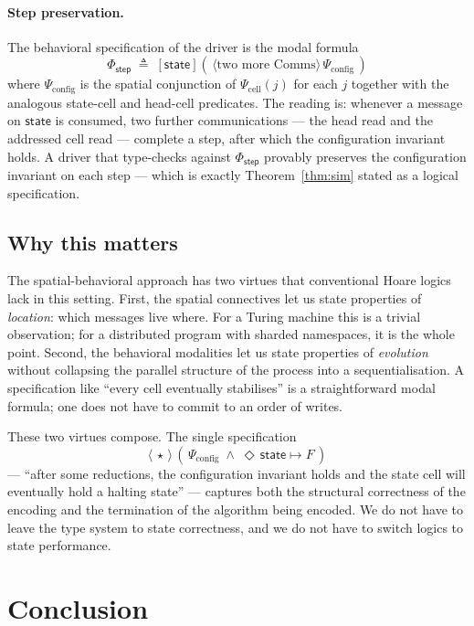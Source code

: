 \documentclass[11pt]{article}
\theoremstyle{plain}
\theoremstyle{definition}
\theoremstyle{remark}
\newcommand{\Step}{\mathsf{step}}
\newcommand{\St}{\mathsf{state}}
\begin{document}
\paragraph{Step preservation.}
The behavioral specification of the driver is the modal formula
$$
\Phi_{\Step}
\;\triangleq\;
[\St](\,\langle \text{two more Comms}\rangle\,\Psi_{\text{config}}\,)
$$
\noindent where $\Psi_{\text{config}}$ is the spatial conjunction of
$\Psi_{\text{cell}}(j)$ for each $j$ together with the analogous
state-cell and head-cell predicates. The reading is: whenever a message
on $\St$ is consumed, two further communications --- the head read and
the addressed cell read --- complete a step, after which the
configuration invariant holds. A driver that type-checks against
$\Phi_{\Step}$ provably preserves the configuration invariant on each
step --- which is exactly Theorem~\ref{thm:sim} stated as a logical
specification.

\subsection{Why this matters}

The spatial-behavioral approach has two virtues that conventional Hoare
logics lack in this setting. First, the spatial connectives let us state
properties of \emph{location}: which messages live where. For a Turing
machine this is a trivial observation; for a distributed program with
sharded namespaces, it is the whole point. Second, the behavioral
modalities let us state properties of \emph{evolution} without
collapsing the parallel structure of the process into a sequentialisation.
A specification like ``every cell eventually stabilises'' is a
straightforward modal formula; one does not have to commit to an order
of writes.

These two virtues compose. The single specification
$$
\langle\, \star\, \rangle\,(\,\Psi_{\text{config}} \;\land\; \Diamond\,\St \mapsto F\,)
$$
\noindent --- ``after some reductions, the configuration invariant holds
and the state cell will eventually hold a halting state'' --- captures
both the structural correctness of the encoding and the termination of
the algorithm being encoded. We do not have to leave the type system to
state correctness, and we do not have to switch logics to state
performance.

\section{Conclusion}\label{sec:concl}
\end{document}

